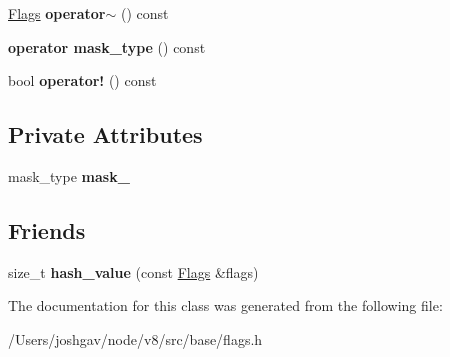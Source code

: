 \begin{DoxyCompactItemize}
\item 
\hyperlink{classv8_1_1base_1_1_flags}{Flags} {\bfseries operator$\sim$} () const \hypertarget{classv8_1_1base_1_1_flags_afcf4d43a05193c48c76bb2e6484dd3fa}{}\label{classv8_1_1base_1_1_flags_afcf4d43a05193c48c76bb2e6484dd3fa}

\item 
{\bfseries operator mask\+\_\+type} () const \hypertarget{classv8_1_1base_1_1_flags_aa8ac6bff18983bf56294dcaed8380c74}{}\label{classv8_1_1base_1_1_flags_aa8ac6bff18983bf56294dcaed8380c74}

\item 
bool {\bfseries operator!} () const \hypertarget{classv8_1_1base_1_1_flags_aff36166638edd73265212c8c9ae09e3b}{}\label{classv8_1_1base_1_1_flags_aff36166638edd73265212c8c9ae09e3b}

\end{DoxyCompactItemize}
\subsection*{Private Attributes}
\begin{DoxyCompactItemize}
\item 
mask\+\_\+type {\bfseries mask\+\_\+}\hypertarget{classv8_1_1base_1_1_flags_a0e49d9d8d4b70278c51a1d20a6ccfe70}{}\label{classv8_1_1base_1_1_flags_a0e49d9d8d4b70278c51a1d20a6ccfe70}

\end{DoxyCompactItemize}
\subsection*{Friends}
\begin{DoxyCompactItemize}
\item 
size\+\_\+t {\bfseries hash\+\_\+value} (const \hyperlink{classv8_1_1base_1_1_flags}{Flags} \&flags)\hypertarget{classv8_1_1base_1_1_flags_a798e1ab62fe51cbaa2525ac9f01f460b}{}\label{classv8_1_1base_1_1_flags_a798e1ab62fe51cbaa2525ac9f01f460b}

\end{DoxyCompactItemize}


The documentation for this class was generated from the following file\+:\begin{DoxyCompactItemize}
\item 
/\+Users/joshgav/node/v8/src/base/flags.\+h\end{DoxyCompactItemize}

